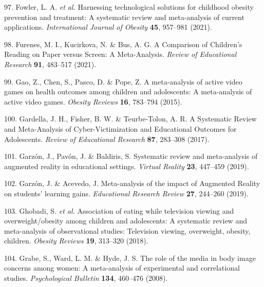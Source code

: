 \documentclass[
  english,
  man]{apa6}
\newenvironment{cslreferences}%
  {}%
  {\par}
\begin{document}
\begin{cslreferences}
\leavevmode\hypertarget{ref-fowlerHarnessingTechnologicalSolutions2021}{}%
97. Fowler, L. A. \emph{et al.} Harnessing technological solutions for childhood obesity prevention and treatment: A systematic review and meta-analysis of current applications. \emph{International Journal of Obesity} \textbf{45}, 957--981 (2021).

\leavevmode\hypertarget{ref-furenesComparisonChildrenReading2021}{}%
98. Furenes, M. I., Kucirkova, N. \& Bus, A. G. A Comparison of Children's Reading on Paper versus Screen: A Meta-Analysis. \emph{Review of Educational Research} \textbf{91}, 483--517 (2021).

\leavevmode\hypertarget{ref-gaoMetaanalysisActiveVideo2015}{}%
99. Gao, Z., Chen, S., Pasco, D. \& Pope, Z. A meta-analysis of active video games on health outcomes among children and adolescents: A meta-analysis of active video games. \emph{Obesity Reviews} \textbf{16}, 783--794 (2015).

\leavevmode\hypertarget{ref-gardellaSystematicReviewMetaAnalysis2017}{}%
100. Gardella, J. H., Fisher, B. W. \& Teurbe-Tolon, A. R. A Systematic Review and Meta-Analysis of Cyber-Victimization and Educational Outcomes for Adolescents. \emph{Review of Educational Research} \textbf{87}, 283--308 (2017).

\leavevmode\hypertarget{ref-garzonSystematicReviewMetaanalysis2019}{}%
101. Garzón, J., Pavón, J. \& Baldiris, S. Systematic review and meta-analysis of augmented reality in educational settings. \emph{Virtual Reality} \textbf{23}, 447--459 (2019).

\leavevmode\hypertarget{ref-garzonMetaanalysisImpactAugmented2019}{}%
102. Garzón, J. \& Acevedo, J. Meta-analysis of the impact of Augmented Reality on students' learning gains. \emph{Educational Research Review} \textbf{27}, 244--260 (2019).

\leavevmode\hypertarget{ref-ghobadiAssociationEatingTelevision2018}{}%
103. Ghobadi, S. \emph{et al.} Association of eating while television viewing and overweight/obesity among children and adolescents: A systematic review and meta-analysis of observational studies: Television viewing, overweight, obesity, children. \emph{Obesity Reviews} \textbf{19}, 313--320 (2018).

\leavevmode\hypertarget{ref-grabeRoleMediaBody2008}{}%
104. Grabe, S., Ward, L. M. \& Hyde, J. S. The role of the media in body image concerns among women: A meta-analysis of experimental and correlational studies. \emph{Psychological Bulletin} \textbf{134}, 460--476 (2008).


\end{cslreferences}
\end{document}
